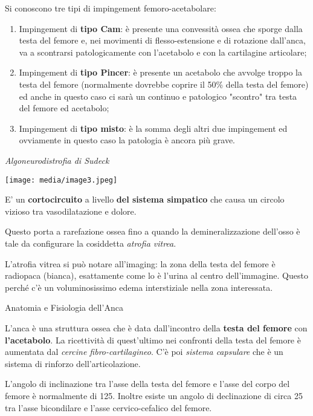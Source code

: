 \documentclass[]{article}
\begin{document}
Si conoscono tre tipi di impingement femoro-acetabolare:

\begin{enumerate}
\def\labelenumi{\arabic{enumi}.}
\item
  Impingement di \textbf{tipo Cam}: è presente una convessità ossea che
  sporge dalla testa del femore e, nei movimenti di flesso-estensione e
  di rotazione dall'anca, va a scontrarsi patologicamente con
  l'acetabolo e con la cartilagine articolare;
\item
  Impingement di \textbf{tipo Pincer}: è presente un acetabolo che
  avvolge troppo la testa del femore (normalmente dovrebbe coprire il
  50\% della testa del femore) ed anche in questo caso ci sarà un
  continuo e patologico "scontro" tra testa del femore ed acetabolo;
\item
  Impingement di \textbf{tipo misto}: è la somma degli altri due
  impingement ed ovviamente in questo caso la patologia è ancora più
  grave.
\end{enumerate}

\emph{Algoneurodistrofia di Sudeck}

\texttt{[image: media/image3.jpeg]}

E' un \textbf{cortocircuito} a livello \textbf{del sistema simpatico}
che causa un circolo vizioso tra vasodilatazione e dolore.

Questo porta a rarefazione ossea fino a quando la demineralizzazione
dell'osso è tale da configurare la cosiddetta \emph{atrofia vitrea}.

L'atrofia vitrea si può notare all'imaging: la zona della testa del
femore è radiopaca (bianca), esattamente come lo è l'urina al centro
dell'immagine. Questo perché c'è un voluminosissimo edema interstiziale
nella zona interessata.

Anatomia e Fisiologia dell'Anca

L'anca è una struttura ossea che è data dall'incontro della
\textbf{testa del femore} con \textbf{l'acetabolo}. La ricettività di
quest'ultimo nei confronti della testa del femore è aumentata dal
\emph{cercine fibro-cartilagineo}. C'è poi \emph{sistema capsulare} che
è un sistema di rinforzo dell'articolazione.

L'angolo di inclinazione tra l'asse della testa del femore e l'asse del
corpo del femore è normalmente di 125\(\). Inoltre esiste un angolo di
declinazione di circa 25\(\) tra l'asse bicondilare e l'asse
cervico-cefalico del femore.
\end{document}
